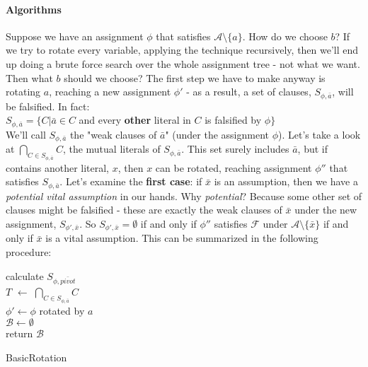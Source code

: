 \documentclass[]{article}
\begin{document}
	\paragraph{Algorithms}
	Suppose we have an assignment $ \phi $ that satisfies $ \mathcal{A}\setminus \{a\} $. How do we choose $ b $? If we try to rotate every variable, applying the technique recursively, then we'll end up doing a brute force search over the whole assignment tree - not what we want. Then what $ b $ should we choose? The first step we have to make anyway is rotating $ a $, reaching a new assignment $ \phi' $ - as a result, a set of clauses, $ S_{\phi,\bar{a}} $, will be falsified. In fact:\\ $ S_{\phi,\bar{a}} = \{ C | \bar{a} \in C $ and every \textbf{other} literal in $ C $ is  falsified by $ \phi \} $\\
	We'll call $ S_{\phi,\bar{a}} $ the "weak clauses of $ \bar{a} $" (under the assignment $ \phi $). Let's take a look at $ \bigcap_{C \in S_{\phi,\bar{a}}} C $, the mutual literals of $ S_{\phi,\bar{a}} $. This set surely includes $ \bar{a} $, but if contains another literal, $ x $, then $ x $ can be rotated, reaching assignment $ \phi'' $ that satisfies $ S_{\phi,\bar{a}} $.
	 Let's examine the \textbf{first case}: if $ \bar{x} $ is an assumption, then we have a \textit{potential vital assumption} in our hands. Why \textit{potential}? Because some other set of clauses might be falsified - these are exactly the weak clauses of $ \bar{x} $ under the new assignment, $ S_{\phi', \bar{x}} $. So $  S_{\phi', \bar{x}}  = \emptyset $ if and only if $ \phi'' $ satisfies $ \mathcal{F} $ under $ \mathcal{A} \setminus \{\bar{x}\} $ if and only if $ \bar{x} $ is a vital assumption.
	 This can be summarized in the following procedure:\\
	 \begin{algorithm}[H]
	 	calculate $ S_{\phi,\bar{pivot}} $\\
	 	$ T $ $ \leftarrow $ $ \bigcap_{C \in S_{\phi,\bar{a}}} C $\\
	 	$ \phi' \leftarrow \phi $ rotated by $ a $\\
	 	$ \mathcal{B} \leftarrow \emptyset $  \\
	 	return $ \mathcal{B} $
	 	\caption{BasicRotation}
	 \end{algorithm}
 
\end{document}
